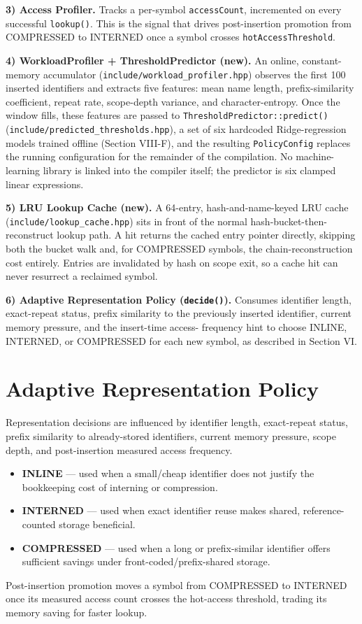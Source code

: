\documentclass[conference]{IEEEtran}
\begin{document}
\textbf{3) Access Profiler.} Tracks a per-symbol \texttt{accessCount},
incremented on every successful \texttt{lookup()}. This is the signal that
drives post-insertion promotion from COMPRESSED to INTERNED once a symbol
crosses \texttt{hotAccessThreshold}.

\textbf{4) WorkloadProfiler + ThresholdPredictor (new).} An online,
constant-memory accumulator (\texttt{include/workload\_profiler.hpp})
observes the first 100 inserted identifiers and extracts five features: mean
name length, prefix-similarity coefficient, repeat rate, scope-depth
variance, and character-entropy. Once the window fills, these features are
passed to \texttt{ThresholdPredictor::predict()}
(\texttt{include/predicted\_thresholds.hpp}), a set of six hardcoded
Ridge-regression models trained offline (Section VIII-F), and the resulting
\texttt{PolicyConfig} replaces the running configuration for the remainder
of the compilation. No machine-learning library is linked into the compiler
itself; the predictor is six clamped linear expressions.

\textbf{5) LRU Lookup Cache (new).} A 64-entry, hash-and-name-keyed LRU cache
(\texttt{include/lookup\_cache.hpp}) sits in front of the normal
hash-bucket-then-reconstruct lookup path. A hit returns the cached entry
pointer directly, skipping both the bucket walk and, for COMPRESSED
symbols, the chain-reconstruction cost entirely. Entries are invalidated by
hash on scope exit, so a cache hit can never resurrect a reclaimed symbol.

\textbf{6) Adaptive Representation Policy (\texttt{decide()}).} Consumes
identifier length, exact-repeat status, prefix similarity to the previously
inserted identifier, current memory pressure, and the insert-time access-
frequency hint to choose INLINE, INTERNED, or COMPRESSED for each new
symbol, as described in Section VI.

\section{Adaptive Representation Policy}
Representation decisions are influenced by identifier length, exact-repeat
status, prefix similarity to already-stored identifiers, current memory
pressure, scope depth, and post-insertion measured access frequency.
\begin{itemize}
\item \textbf{INLINE} --- used when a small/cheap identifier does not
  justify the bookkeeping cost of interning or compression.
\item \textbf{INTERNED} --- used when exact identifier reuse makes shared,
  reference-counted storage beneficial.
\item \textbf{COMPRESSED} --- used when a long or prefix-similar identifier
  offers sufficient savings under front-coded/prefix-shared storage.
\end{itemize}
Post-insertion promotion moves a symbol from COMPRESSED to INTERNED once its
measured access count crosses the hot-access threshold, trading its memory
saving for faster lookup.
\end{document}
